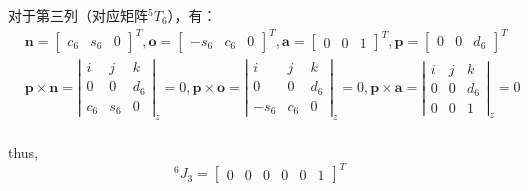 \documentclass{ctexart}
\begin{document}
对于第三列（对应矩阵$^5T_6$），有：
\begin{equation}
	\begin{aligned}
		&\boldsymbol{n} = \begin{bmatrix}
			c_6 & s_6 & 0
		\end{bmatrix}^T, \boldsymbol{o} = \begin{bmatrix}
			-s_6 & c_6 & 0	
		\end{bmatrix}^T, \boldsymbol{a} = \begin{bmatrix}
			0 & 0 & 1
		\end{bmatrix}^T, \boldsymbol{p} = \begin{bmatrix}
			0 & 0 & d_6
		\end{bmatrix}^T\\
		&\boldsymbol{p}\times \boldsymbol{n} = \left| \begin{matrix}
			i & j & k \\
			0 & 0 & d_6 \\
			c_6 & s_6 & 0
		\end{matrix} \right|_z = 0, \boldsymbol{p}\times \boldsymbol{o} = \left| \begin{matrix}
			i & j & k \\
			0 & 0 & d_6 \\
			-s_6 & c_6 & 0
		\end{matrix} \right|_z = 0, \boldsymbol{p}\times \boldsymbol{a} = \left| \begin{matrix}
			i & j & k \\
			0 & 0 & d_6 \\
			0 & 0 & 1
		\end{matrix} \right|_z = 0\\
	\end{aligned}
\end{equation}

thus,
\begin{equation*}
^6J_{3} = \begin{bmatrix}
	0 & 0 & 0 & 0 & 0 & 1
\end{bmatrix}^T
\end{equation*}
\end{document}
